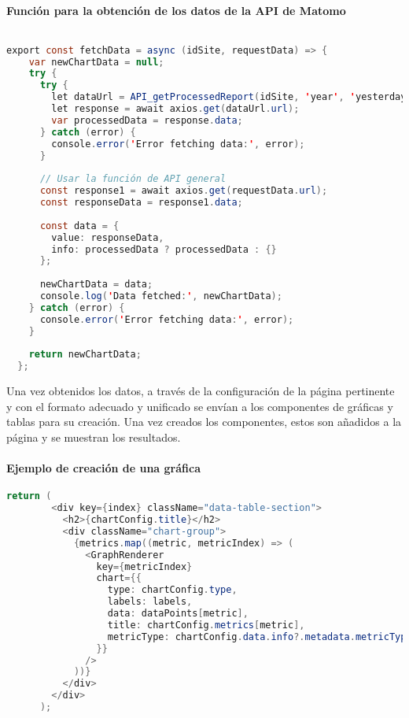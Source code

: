 \paragraph{Función para la obtención de los datos de la API de Matomo}
\begin{lstlisting}[language=Java]
    
export const fetchData = async (idSite, requestData) => {
    var newChartData = null;
    try {
      try {
        let dataUrl = API_getProcessedReport(idSite, 'year', 'yesterday', requestData.module, requestData.action, language);
        let response = await axios.get(dataUrl.url);
        var processedData = response.data;
      } catch (error) {
        console.error('Error fetching data:', error);
      }
  
      // Usar la función de API general
      const response1 = await axios.get(requestData.url);
      const responseData = response1.data;
  
      const data = {
        value: responseData,
        info: processedData ? processedData : {}
      };
  
      newChartData = data;
      console.log('Data fetched:', newChartData);
    } catch (error) {
      console.error('Error fetching data:', error);
    }
  
    return newChartData;
  };
\end{lstlisting}


Una vez obtenidos los datos, a través de la configuración de la página pertinente y con el formato adecuado y unificado se envían
a los componentes de gráficas y tablas para su creación. Una vez creados los componentes, estos son añadidos a la página y se
muestran los resultados.

\paragraph{Ejemplo de creación de una gráfica}
\begin{lstlisting}[language=Java]
    return (
        <div key={index} className="data-table-section">
          <h2>{chartConfig.title}</h2>
          <div className="chart-group">
            {metrics.map((metric, metricIndex) => (
              <GraphRenderer
                key={metricIndex}
                chart={{
                  type: chartConfig.type,
                  labels: labels,
                  data: dataPoints[metric],
                  title: chartConfig.metrics[metric],
                  metricType: chartConfig.data.info?.metadata.metricTypes[metric] || 'number',
                }}
              />
            ))}
          </div>
        </div>
      );
\end{lstlisting}

